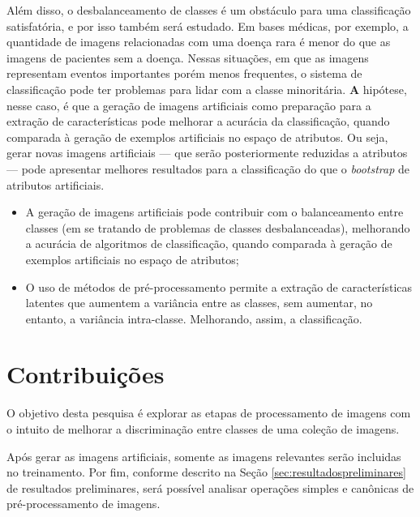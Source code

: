 Além disso,
o desbalanceamento de classes é um obstáculo para uma classificação satisfatória, e por isso também será estudado.
Em bases médicas, por exemplo, a quantidade de imagens relacionadas com uma doença rara é menor do que as imagens de pacientes sem a doença. Nessas situações, em que as imagens representam eventos importantes porém menos frequentes, o sistema de classificação pode ter problemas para lidar com a classe minoritária. {\textbf A hipótese, nesse caso, é que a geração de imagens artificiais como preparação para a extração de características pode melhorar a acurácia da classificação, quando comparada à geração de exemplos artificiais no espaço de atributos.} Ou seja, gerar novas imagens artificiais — que serão posteriormente reduzidas a atributos — pode apresentar melhores resultados para a classificação do que o \textit{bootstrap} de atributos artificiais.


\begin{itemize}
\item A geração de imagens artificiais pode contribuir com o balanceamento entre classes (em se tratando de problemas de classes desbalanceadas), melhorando a acurácia de algoritmos de classificação, quando comparada à geração de exemplos artificiais no espaço de atributos;
\item O uso de métodos de pré-processamento permite a extração de características latentes que aumentem a variância entre as classes, sem aumentar, no entanto, a variância intra-classe. Melhorando, assim, a classificação.
\end{itemize}

\section{Contribuições}

O objetivo desta pesquisa é explorar as etapas de processamento de imagens com o intuito de melhorar a discriminação entre classes de uma coleção de imagens.

Após gerar as imagens artificiais, somente as imagens relevantes serão incluidas no treinamento. Por fim, conforme descrito na Seção \ref{sec:resultadospreliminares} de resultados preliminares, será possível analisar operações simples e canônicas de pré-processamento de imagens.

